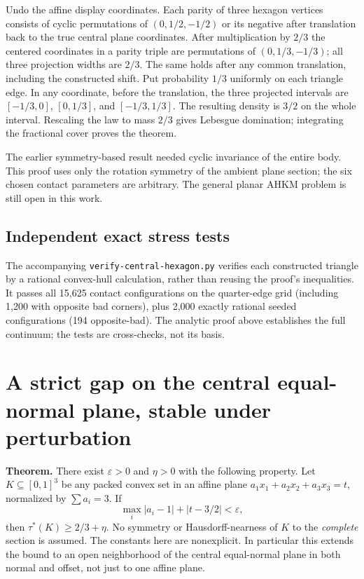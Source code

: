 \documentclass[
  10pt,
]{article}
\begin{document}
Undo the affine display coordinates. Each parity of three hexagon
vertices consists of cyclic permutations of \((0,1/2,-1/2)\) or its
negative after translation back to the true central plane coordinates.
After multiplication by \(2/3\) the centered coordinates in a parity
triple are permutations of \((0,1/3,-1/3)\); all three projection widths
are \(2/3\). The same holds after any common translation, including the
constructed shift. Put probability \(1/3\) uniformly on each triangle
edge. In any coordinate, before the translation, the three projected
intervals are \([-1/3,0]\), \([0,1/3]\), and \([-1/3,1/3]\). The
resulting density is \(3/2\) on the whole interval. Rescaling the law to
mass \(2/3\) gives Lebesgue domination; integrating the fractional cover
proves the theorem.

The earlier symmetry-based result needed cyclic invariance of the entire
body. This proof uses only the rotation symmetry of the ambient plane
section; the six chosen contact parameters are arbitrary. The general
planar AHKM problem is still open in this work.

\subsection{Independent exact stress
tests}\label{independent-exact-stress-tests}

The accompanying \texttt{verify-central-hexagon.py} verifies each
constructed triangle by a rational convex-hull calculation, rather than
reusing the proof's inequalities. It passes all 15,625 contact
configurations on the quarter-edge grid (including 1,200 with opposite
bad corners), plus 2,000 exactly rational seeded configurations (194
opposite-bad). The analytic proof above establishes the full continuum;
the tests are cross-checks, not its basis.

\section{A strict gap on the central equal-normal plane, stable under
perturbation}\label{a-strict-gap-on-the-central-equal-normal-plane-stable-under-perturbation}


\textbf{Theorem.} There exist \(\varepsilon>0\) and \(\eta>0\) with the
following property. Let \(K\subseteq[0,1]^3\) be any packed convex set
in an affine plane \(a_1x_1+a_2x_2+a_3x_3=t\), normalized by
\(\sum a_i=3\). If \[
\max_i |a_i-1|+|t-3/2|<\varepsilon,
\] then \(\tau^*(K)\ge 2/3+\eta\). No symmetry or Hausdorff-nearness of
\(K\) to the \emph{complete} section is assumed. The constants here are
nonexplicit. In particular this extends the bound to an open
neighborhood of the central equal-normal plane in both normal and
offset, not just to one affine plane.
\end{document}
